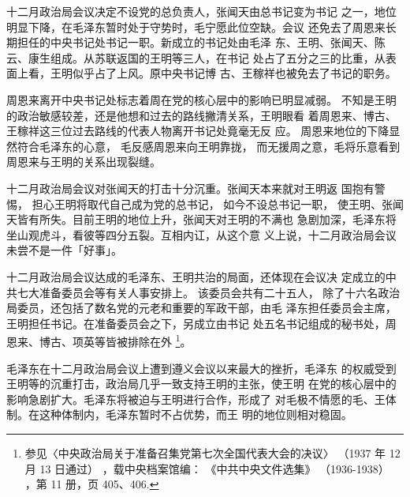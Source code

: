 十二月政治局会议决定不设党的总负责人，张闻天由总书记变为书记
之一，地位明显下降，在毛泽东暂时处于守势时，毛宁愿此位空缺。会议
还免去了周恩来长期担任的中央书记处书记一职。新成立的书记处由毛泽
东、王明、张闻天、陈云、康生组成。从苏联返国的王明等三人，在书记
处占了五分之三的比重，从表面上看，王明似乎占了上风。原中央书记博
古、王稼祥也被免去了书记的职务。

周恩来离开中央书记处标志着周在党的核心层中的影响已明显减弱。
不知是王明的政治敏感较差，还是他想和过去的路线撇清关系，王明眼看
着周恩来、博古、王稼祥这三位过去路线的代表人物离开书记处竟毫无反
应。
周恩来地位的下降显然符合毛泽东的心意，
毛反感周恩来向王明靠拢，
而无援周之意，毛将乐意看到周恩来与王明的关系出现裂缝。

十二月政治局会议对张闻天的打击十分沉重。张闻天本来就对王明返
国抱有警惕，
担心王明将取代自己成为党的总书记，
如今不设总书记一职，
使王明、张闻天皆有所失。目前王明的地位上升，张闻天对王明的不满也
急剧加深，毛泽东将坐山观虎斗，看彼等四分五裂。互相内讧，从这个意
义上说，十二月政治局会议未尝不是一件「好事」。

十二月政治局会议达成的毛泽东、王明共治的局面，还体现在会议决
定成立的中共七大准备委员会等有关人事安排上。
该委员会共有二十五人，
除了十六名政治局委员，还包括了数名党的元老和重要的军政干部，由毛
泽东担任委员会主席，王明担任书记。在准备委员会之下，另成立由书记
处五名书记组成的秘书处，周恩来、博古、项英等皆被排除在外
\footnote{参见〈中央政治局关于准备召集党第七次全国代表大会的决议〉
（1937 年 12 月 13 日通过）
，载中央档案馆编：
《中共中央文件选集》
（1936-1938）
，第 11 册，页 405、406.}。

毛泽东在十二月政治局会议上遭到遵义会议以来最大的挫折，毛泽东
的权威受到王明等的沉重打击，政治局几乎一致支持王明的主张，使王明
在党的核心层中的影响急剧扩大。毛泽东将被迫与王明进行合作，形成了
对毛极不情愿的毛、王体制。在这种体制内，毛泽东暂时不占优势，而王
明的地位则相对稳固。
 

